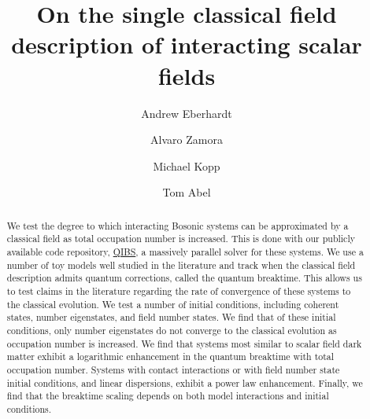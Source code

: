 \documentclass[aps,prd,twocolumn,superscriptaddress]{revtex4-1}
\begin{document}
\title{On the single classical field description of interacting scalar fields}
\author{Andrew Eberhardt}
\author{Alvaro Zamora}
\author{Michael Kopp}
\author{Tom Abel}
\begin{abstract}

We test the degree to which interacting Bosonic systems can be approximated by a classical field as total occupation number is increased. This is done with our publicly available code repository, \href{https://github.com/andillio/QIBS}{QIBS}, a massively parallel solver for these systems. We use a number of toy models well studied in the literature and track when the classical field description admits quantum corrections, called the quantum breaktime. This allows us to test claims in the literature regarding the rate of convergence of these systems to the classical evolution. We test a number of initial conditions, including coherent states, number eigenstates, and field number states. We find that of these initial conditions, only number eigenstates do not converge to the classical evolution as occupation number is increased. We find that systems most similar to scalar field dark matter exhibit a logarithmic enhancement in the quantum breaktime with total occupation number. Systems with contact interactions or with field number state initial conditions, and linear dispersions, exhibit a power law enhancement. Finally, we find that the breaktime scaling depends on both model interactions and initial conditions.
\end{abstract}

\maketitle
\end{document}
